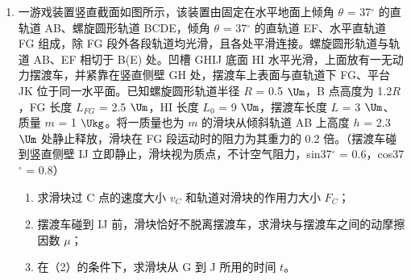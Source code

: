 \documentclass[\gkver]{gaokaozhenti}
\begin{document}
\begin{enumerate}
{ $\Delta U = W + Q$

解得  $Q = \Delta U + W = 188\UJ$
}

\item
一游戏装置竖直截面如图所示，该装置由固定在水平地面上倾角 $\theta$ = 37${^\circ}$ 的直轨道 AB、螺旋圆形轨道 BCDE，倾角 $\theta$ = 37${^\circ}$ 的直轨道 EF、水平直轨道 FG 组成，除 FG 段外各段轨道均光滑，且各处平滑连接。螺旋圆形轨道与轨道 AB、EF 相切于 B(E) 处。凹槽 GHIJ 底面 HI 水平光滑，上面放有一无动力摆渡车，并紧靠在竖直侧壁 GH 处，摆渡车上表面与直轨道下 FG、平台 JK 位于同一水平面。已知螺旋圆形轨道半径 $R$ = 0.5 $\Um$，B 点高度为 1.2$R$，FG 长度 $L_{FG}$ = 2.5 $\Um$，HI 长度 $L_{0}$ = 9 $\Um$，摆渡车长度 $L$ = 3 $\Um$、质量 $m$ = 1 $\Ukg$。将一质量也为 $m$ 的滑块从倾斜轨道 AB 上高度 $h$ = 2.3 $\Um$ 处静止释放，滑块在 FG 段运动时的阻力为其重力的 0.2 倍。（摆渡车碰到竖直侧壁 IJ 立即静止，滑块视为质点，不计空气阻力，sin37${^\circ}$ = 0.6，cos37${^\circ}$ = 0.8）
\begin{enumerate}
	\item
	求滑块过 C 点的速度大小 $v_{C}$ 和轨道对滑块的作用力大小 $F_{C}$；
	\item
	摆渡车碰到 IJ 前，滑块恰好不脱离摆渡车，求滑块与摆渡车之间的动摩擦因数 $\mu$；
	\item
	在（2）的条件下，求滑块从 G 到 J 所用的时间 $t$。
\end{enumerate}
\onepicture[align=right, w=7.2cm]{}
\end{enumerate}
\end{document}
